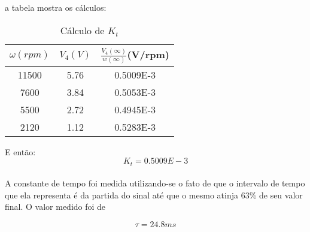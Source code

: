 a tabela mostra os cálculos:

\begin{table}[H]
\centering
\begin{tabular}{|c|c|c|}
\hline
 $\omega (rpm)$ & $V_4(V)$ & $\frac{V_4(\infty)}{w(\infty)}$(V/rpm)\\
\hline
11500 & 5.76 & 0.5009E-3 \\
\hline
 7600 & 3.84 & 0.5053E-3\\
\hline
5500 & 2.72 & 0.4945E-3\\
\hline
2120 & 1.12 & 0.5283E-3\\
\hline
\end{tabular}
\caption{Cálculo de $K_t$}
\label{tab:teste1-analise3}
\end{table}

E então:
\begin{equation}
	\boxed{K_t = 0.5009E-3}
\end{equation}


\paragraph{}
A constante de tempo foi medida utilizando-se o fato de que o intervalo de tempo que ela representa é da partida do sinal até que o mesmo atinja 63\% de seu valor final. O valor medido foi de 

\begin{equation}
    \boxed{\tau = 24.8ms}
\end{equation}
